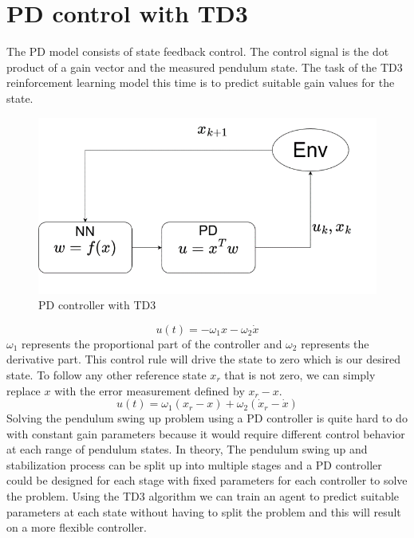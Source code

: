 \documentclass{LTHtwocol} %
\begin{document}
\section{PD control with TD3}
The PD model consists of state feedback control. The control signal is the dot product of a gain vector and the measured pendulum state. The task of the TD3 reinforcement learning model this time is to predict suitable gain values for the state.
\begin{figure}[h]
    \centering
    \includegraphics[width=0.7\columnwidth]{pic/PD.png}
    \caption{PD controller with TD3}
    \label{fig:my_label}
\end{figure}
\begin{equation}
    u(t) = - \omega_1 x - \omega_2 \dot x
\end{equation}
$\omega_1$ represents the proportional part of the controller and $\omega_2$ represents the derivative part. This control rule will drive the state to zero which is our desired state. To follow any other reference state $x_r$ that is not zero, we can simply replace $x$ with the error measurement defined by $x_r - x$.
\begin{equation}
    u(t) = \omega_1 (x_r - x) + \omega_2 (\dot x_r - \dot x)
\end{equation}
Solving the pendulum swing up problem using a PD controller is quite hard to do with constant gain parameters because it would require different control behavior at each range of pendulum states. In theory, The pendulum swing up and stabilization process can be split up into multiple stages and a PD controller could be designed for each stage with fixed parameters for each controller to solve the problem. Using the TD3 algorithm we can train an agent to predict suitable parameters at each state without having to split the problem and this will result on a more flexible controller.
\end{document}

